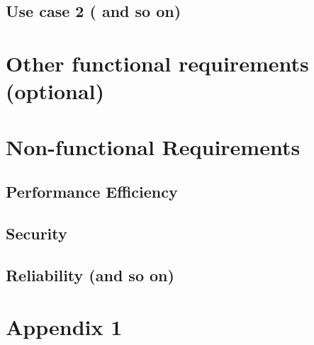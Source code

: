 \documentclass[a4paper, 11pt, oneside]{report}
\begin{document}
\section{Use case 2 ( and so on)}
\chapter{Other functional requirements (optional)}
\chapter{Non-functional Requirements}
\section{Performance Efficiency}
\section{Security}
\section{Reliability (and so on)}






\clearpage
\appendix
\chapter{Appendix 1}
\label{app:iteratieplan}
\end{document}
